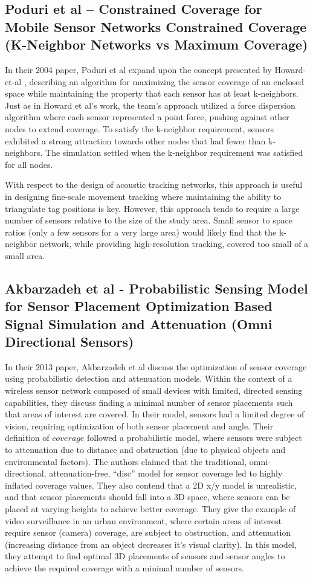 \subsection{Poduri et al – Constrained Coverage for Mobile Sensor Networks Constrained Coverage (K-Neighbor Networks vs Maximum Coverage)}
In their 2004 paper, Poduri et al\cite{Poduri2004} expand upon the concept presented by Howard-et-al \cite{Howard2002}, describing an algorithm for maximizing the sensor coverage of an enclosed space while maintaining the property that each sensor has at least k-neighbors. Just as in Howard et al's work, the team's approach utilized a force dispersion algorithm where each sensor represented a point force, pushing against other nodes to extend coverage.  To satisfy the k-neighbor requirement, sensors exhibited a strong attraction towards other nodes that had fewer than k-neighbors.  The simulation settled when the k-neighbor requirement was satisfied for all nodes.  

With respect to the design of acoustic tracking networks, this approach is useful in designing fine-scale movement tracking where maintaining the ability to triangulate tag positions is key.  However, this approach tends to require a large number of sensors relative to the size of the study area.  Small sensor to space ratios (only a few sensors for a very large area) would likely find that the k-neighbor network, while providing high-resolution tracking, covered too small of a small area.

\subsection{Akbarzadeh et al - Probabilistic Sensing Model for Sensor Placement Optimization Based Signal Simulation and Attenuation (Omni Directional Sensors)}
In their 2013 paper, Akbarzadeh et al\cite{Akbarzadeh2013} discuss the optimization of sensor coverage using probabilistic detection and attenuation models.  Within the context of a wireless sensor network composed of small devices with limited, directed sensing capabilities, they discuss finding a minimal number of sensor placements such that areas of interest are covered.  In their model, sensors had a limited degree of vision, requiring optimization of both sensor placement and angle.  Their definition of $coverage$ followed a probabilistic model, where sensors were subject to attenuation due to distance and obstruction (due to physical objects and environmental factors).  The authors claimed that the traditional, omni-directional, attenuation-free, ``disc'' model for sensor coverage led to highly inflated coverage values.  They also contend that a 2D x/y model is unrealistic, and that sensor placements should fall into a 3D space, where sensors can be placed at varying heights to achieve better coverage.  They give the example of video surveillance in an urban environment, where certain areas of interest require sensor (camera) coverage, are subject to obstruction, and attenuation (increasing distance from an object decreases it's visual clarity).  In this model, they attempt to find optimal 3D placements of sensors and sensor angles to achieve the required coverage with a minimal number of sensors. 

